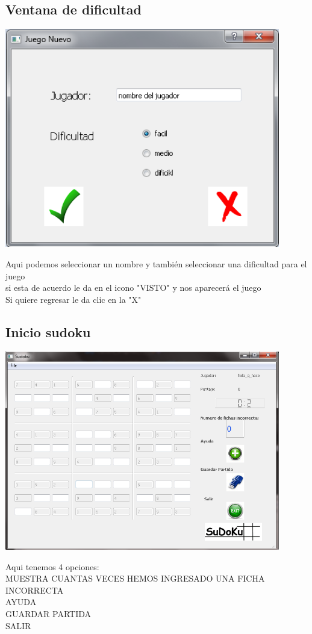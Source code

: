 \documentclass[12pt]{extbook}
\begin{document}
\begin{center}
\section{Ventana de dificultad}
\end{center}
\begin{center}
\includegraphics[width=12cm]{nombre_jug.png}
\end{center}
Aqui podemos seleccionar un  nombre y también seleccionar una dificultad para el juego\\
si esta de acuerdo le da en el icono "VISTO" y nos aparecerá el juego \\
Si quiere regresar le da clic en la "X" \\


\begin{center}
\section{Inicio sudoku}
\end{center}
\begin{center}
\includegraphics[width=12cm]{sudoku_ini.png}
\end{center}
Aqui tenemos 4 opciones:\\
MUESTRA CUANTAS VECES HEMOS INGRESADO UNA FICHA INCORRECTA\\
AYUDA\\
GUARDAR PARTIDA\\
SALIR\\
\end{document}
